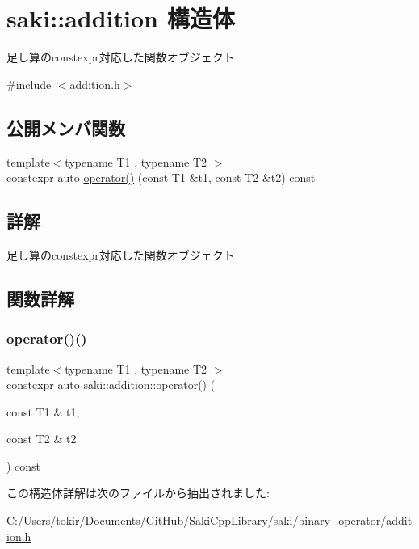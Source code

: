 \hypertarget{structsaki_1_1addition}{}\section{saki\+:\+:addition 構造体}
\label{structsaki_1_1addition}


足し算のconstexpr対応した関数オブジェクト  




{\ttfamily \#include $<$addition.\+h$>$}

\subsection*{公開メンバ関数}
\begin{DoxyCompactItemize}
\item 
{\footnotesize template$<$typename T1 , typename T2 $>$ }\\constexpr auto \mbox{\hyperlink{structsaki_1_1addition_a8bdb3c15f72b4d0f48967fdaa1472049}{operator()}} (const T1 \&t1, const T2 \&t2) const
\end{DoxyCompactItemize}


\subsection{詳解}
足し算のconstexpr対応した関数オブジェクト 

\subsection{関数詳解}
\mbox{\label{structsaki_1_1addition_a8bdb3c15f72b4d0f48967fdaa1472049}} 
\subsubsection{\texorpdfstring{operator()()}{operator()()}}
{\footnotesize\ttfamily template$<$typename T1 , typename T2 $>$ \\
constexpr auto saki\+::addition\+::operator() (\begin{DoxyParamCaption}\item[{const T1 \&}]{t1,  }\item[{const T2 \&}]{t2 }\end{DoxyParamCaption}) const\hspace{0.3cm}{\ttfamily [inline]}}



この構造体詳解は次のファイルから抽出されました\+:\begin{DoxyCompactItemize}
\item 
C\+:/\+Users/tokir/\+Documents/\+Git\+Hub/\+Saki\+Cpp\+Library/saki/binary\+\_\+operator/\mbox{\hyperlink{addition_8h}{addition.\+h}}\end{DoxyCompactItemize}

